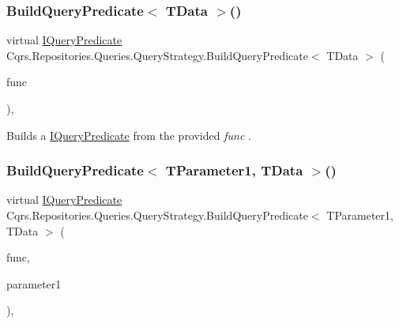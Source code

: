 \subsubsection{\texorpdfstring{Build\+Query\+Predicate$<$ T\+Data $>$()}{BuildQueryPredicate< TData >()}}
{\footnotesize\ttfamily virtual \hyperlink{interfaceCqrs_1_1Repositories_1_1Queries_1_1IQueryPredicate}{I\+Query\+Predicate} Cqrs.\+Repositories.\+Queries.\+Query\+Strategy.\+Build\+Query\+Predicate$<$ T\+Data $>$ (\begin{DoxyParamCaption}\item[{Func$<$ T\+Data $>$}]{func }\end{DoxyParamCaption})\hspace{0.3cm}{\ttfamily [protected]}, {\ttfamily [virtual]}}



Builds a \hyperlink{interfaceCqrs_1_1Repositories_1_1Queries_1_1IQueryPredicate}{I\+Query\+Predicate} from the provided {\itshape func} . 

\mbox{\label{classCqrs_1_1Repositories_1_1Queries_1_1QueryStrategy_a00435830d1204507b1bf515263607be0_a00435830d1204507b1bf515263607be0}} 
\subsubsection{\texorpdfstring{Build\+Query\+Predicate$<$ T\+Parameter1, T\+Data $>$()}{BuildQueryPredicate< TParameter1, TData >()}}
{\footnotesize\ttfamily virtual \hyperlink{interfaceCqrs_1_1Repositories_1_1Queries_1_1IQueryPredicate}{I\+Query\+Predicate} Cqrs.\+Repositories.\+Queries.\+Query\+Strategy.\+Build\+Query\+Predicate$<$ T\+Parameter1, T\+Data $>$ (\begin{DoxyParamCaption}\item[{Func$<$ T\+Parameter1, T\+Data $>$}]{func,  }\item[{T\+Parameter1}]{parameter1 }\end{DoxyParamCaption})\hspace{0.3cm}{\ttfamily [protected]}, {\ttfamily [virtual]}}



